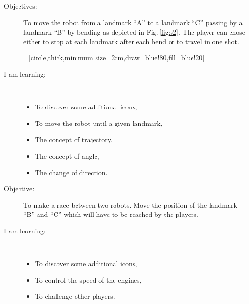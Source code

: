 \begin{flushleft}
\begin{description}
\item[Objectives:] To move the robot from a landmark ``A'' to a landmark ``C'' passing by a landmark ``B'' by bending as depicted in Fig.\,\ref{fig:s2}. The player can chose either to stop at each landmark after each bend or to travel in one shot.
\begin{minipage}[c]{\textwidth}
\centering
{}=[circle,thick,minimum size=2cm,draw=blue!80,fill=blue!20]
\vspace{1ex}
\label{fig:s2}
\end{minipage}
\item[I am learning:] \hfill \\ \vspace{-1ex}
  \begin{itemize}
  \item To discover some additional icons,
  \item To move the robot until a given landmark,
  \item The concept of trajectory,
  \item The concept of angle,
  \item The change of direction.
  \end{itemize}
\end{description}
\end{flushleft}
\frameboxend

\begin{flushleft}
\begin{description}
\item[Objective:] To make a race between two robots. Move the position of the landmark ``B'' and ``C'' which will have to be reached by the players.
\item[I am learning:] \hfill \\ \vspace{-1ex}
  \begin{itemize}
  \item To discover some additional icons,
  \item To control the speed of the engines,
  \item To challenge other players.
  \end{itemize}
\end{description}
\end{flushleft}
\frameboxend
